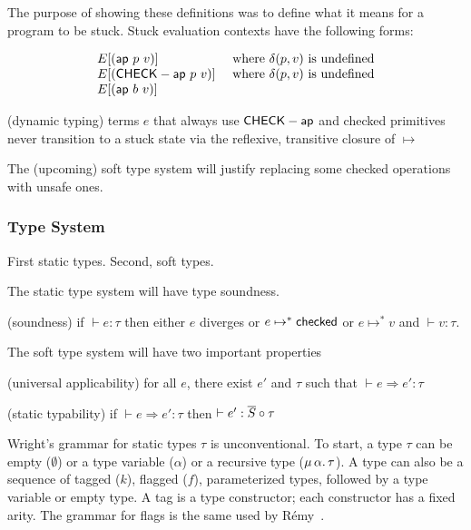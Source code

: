 \documentclass{article}
\begin{document}
The purpose of showing these definitions was to define what it means for a
 program to be stuck.
Stuck evaluation contexts have the following forms:

\[\begin{array}{l l}
   E[(\mathsf{ap}~p~v)] & \mbox{ where } \delta(p, v) \mbox{ is undefined}
\\ E[(\mathsf{CHECK-ap}~p~v)] & \mbox{ where } \delta(p, v) \mbox{ is undefined}
\\ E[(\mathsf{ap}~b~v)]
  \end{array}\]

\begin{proposition}
(dynamic typing) terms $e$ that always use $\mathsf{CHECK-ap}$ and checked primitives never
 transition to a stuck state via the reflexive, transitive closure of $\mapsto$
\end{proposition}

The (upcoming) soft type system will justify replacing some checked operations
 with unsafe ones.


\subsubsection*{Type System}

First static types.
Second, soft types.

The static type system will have type soundness.
\begin{theorem}
(soundness) if $\vdash e : \tau$ then either $e$ diverges or $e \mapsto^* \mathsf{checked}$
 or $e \mapsto^* v$ and $\vdash v : \tau$.
\end{theorem}

The soft type system will have two important properties

\begin{theorem}
(universal applicability) for all $e$, there exist $e'$ and $\tau$ such that
 $\vdash e \Rightarrow e' : \tau$
\end{theorem}

\begin{theorem}
(static typability) if $\vdash e \Rightarrow e' : \tau$ then $\vdash e' : \overline{S} \circ \tau$
\end{theorem}


Wright's grammar for static types $\tau$ is unconventional.
To start, a type $\tau$ can be empty ($\emptyset$) or a type variable ($\alpha$)
 or a recursive type ($\mu\,\alpha.\,\tau$).
A type can also be a sequence of tagged ($k$), flagged ($f$), parameterized
 types, followed by a type variable or empty type.
A tag is a type constructor; each constructor has a fixed arity.
The grammar for flags is the same used by R\'{e}my~\cite{r-popl-1989}.
\end{document}
